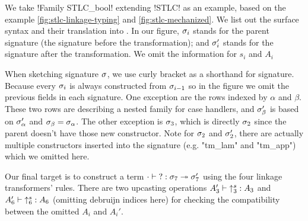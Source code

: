 We take \lsti!Family STLC_bool! extending \lsti!STLC! as an example, based on the example \cref{fig:stlc-linkage-typing} and \cref{fig:stlc-mechanized}. We list out the surface syntax and their translation into \TT. In our figure, $\sigma_i$ stands for the parent signature (the signature before the transformation); and $\sigma_i'$ stands for the signature after the transformation. We omit the information for $s_i$ and $A_i$


When sketching signature $\sigma$, we use curly bracket as a shorthand for signature. Because every $\sigma_i$ is always constructed from $\sigma_{i-1}$ so in the figure we omit the previous fields in each signature.  One exception are the rows indexed by $\alpha$ and $\beta$. These two rows are describing a nested family for case handlers, and $\sigma_\beta'$ is based on $\sigma_\alpha'$ and $\sigma_\beta = \sigma_\alpha$. The other exception is $\sigma_3$, which is directly $\sigma_2$ since the parent doesn't have those new constructor. Note for $\sigma_2$ and $\sigma_2'$, there are actually multiple constructors inserted into the signature (e.g. "tm_lam" and "tm_app") which we omitted here.


Our final target is to construct a term $ {\cdot} \vdash {?} : {\sigma_7} \twoheadrightarrow {\ensuremath{\sigma}_7'}$ using the four linkage transformers' rules. There are two upcasting operations $ {A_3'} \vdash {\uparrow^s_3} : {A_3} $ and $ {A_6'} \vdash {\uparrow^s_6} : {A_6} $ (omitting debruijn indices here) for checking the compatibility between the omitted $A_i$ and $A_i'$.

\fi